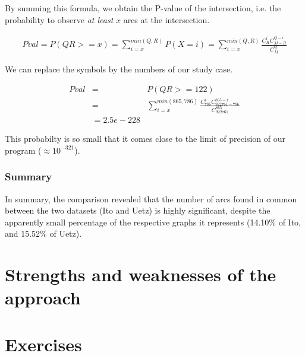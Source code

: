 \begin{enumerate}
By summing this formula, we obtain the P-value of the intersection,
i.e. the probability to observe \textit{at least} $x$ arcs at the
intersection.

\begin{eqnarray*}
\label{eq:hypergeometric_density_cdf}
Pval = P(QR>=x)=\sum_{i=x}^{min(Q,R)}P(X=i)=\sum_{i=x}^{min(Q,R)} \frac{C^i_{R}C^{Q-i}_{M-R}}{C^Q_{M}}
\end{eqnarray*}

We can replace the symbols by the numbers of our study case.

\begin{eqnarray*}
\label{eq:hypergeometric_density_cdf}
Pval & = & P(QR>=122) \\
 & = & \sum_{i=x}^{min(865,786)} \frac{C^i_{786}C^{865-i}_{922761-786}}{C^{865}_{922761}}  \\
 & =  2.5e-228
\end{eqnarray*}

This probabilty is so small that it comes close to the limit of
precision of our program ($\approx 10^{-321}$).

\end{enumerate}

\subsubsection{Summary}

In summary, the comparison revealed that the number of arcs found in
common between the two datasets (Ito and Uetz) is highly significant,
despite the apparently small percentage of the respective graphs it
represents (14.10\% of Ito, and 15.52\% of Uetz).

\section{Strengths and weaknesses of the approach}



\section{Exercises}

